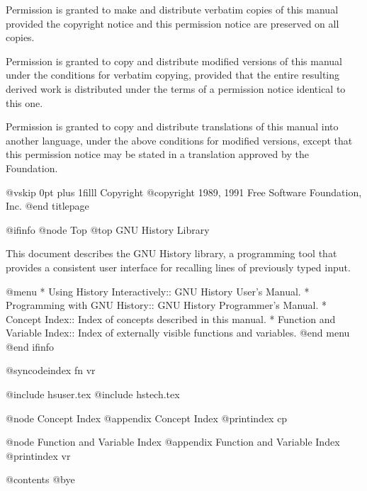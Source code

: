 Permission is granted to make and distribute verbatim copies of
this manual provided the copyright notice and this permission notice
are preserved on all copies.

Permission is granted to copy and distribute modified versions of this
manual under the conditions for verbatim copying, provided that the entire
resulting derived work is distributed under the terms of a permission
notice identical to this one.

Permission is granted to copy and distribute translations of this manual
into another language, under the above conditions for modified versions,
except that this permission notice may be stated in a translation approved
by the Foundation.

@vskip 0pt plus 1filll
Copyright @copyright{} 1989, 1991 Free Software Foundation, Inc.
@end titlepage

@ifinfo
@node Top
@top GNU History Library

This document describes the GNU History library, a programming tool that
provides a consistent user interface for recalling lines of previously
typed input.

@menu
* Using History Interactively::	  GNU History User's Manual.
* Programming with GNU History::  GNU History Programmer's Manual.
* Concept Index::		  Index of concepts described in this manual.
* Function and Variable Index::	  Index of externally visible functions
				  and variables.
@end menu
@end ifinfo

@syncodeindex fn vr

@include hsuser.tex
@include hstech.tex

@node Concept Index
@appendix Concept Index
@printindex cp

@node Function and Variable Index
@appendix Function and Variable Index
@printindex vr

@contents
@bye
